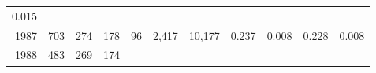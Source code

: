 \documentclass[]{article}
\begin{document}
\begin{longtable}[]{@{}rrrrrrrrrrr@{}}
\begin{minipage}[t]{0.04\columnwidth}
0.015\strut
\end{minipage}\tabularnewline
\begin{minipage}[t]{0.06\columnwidth}\raggedleft\strut
1987\strut
\end{minipage} & \begin{minipage}[t]{0.07\columnwidth}\raggedleft\strut
703\strut
\end{minipage} & \begin{minipage}[t]{0.07\columnwidth}\raggedleft\strut
274\strut
\end{minipage} & \begin{minipage}[t]{0.07\columnwidth}\raggedleft\strut
178\strut
\end{minipage} & \begin{minipage}[t]{0.07\columnwidth}\raggedleft\strut
96\strut
\end{minipage} & \begin{minipage}[t]{0.07\columnwidth}\raggedleft\strut
2,417\strut
\end{minipage} & \begin{minipage}[t]{0.05\columnwidth}\raggedleft\strut
10,177\strut
\end{minipage} & \begin{minipage}[t]{0.09\columnwidth}\raggedleft\strut
0.237\strut
\end{minipage} & \begin{minipage}[t]{0.05\columnwidth}\raggedleft\strut
0.008\strut
\end{minipage} & \begin{minipage}[t]{0.10\columnwidth}\raggedleft\strut
0.228\strut
\end{minipage} & \begin{minipage}[t]{0.04\columnwidth}\raggedleft\strut
0.008\strut
\end{minipage}\tabularnewline
\begin{minipage}[t]{0.06\columnwidth}\raggedleft\strut
1988\strut
\end{minipage} & \begin{minipage}[t]{0.07\columnwidth}\raggedleft\strut
483\strut
\end{minipage} & \begin{minipage}[t]{0.07\columnwidth}\raggedleft\strut
269\strut
\end{minipage} & \begin{minipage}[t]{0.07\columnwidth}\raggedleft\strut
174\strut
\end{minipage} & \begin{minipage}[t]{0.07\columnwidth}\raggedleft\strut

\end{minipage}
\end{longtable}
\end{document}
